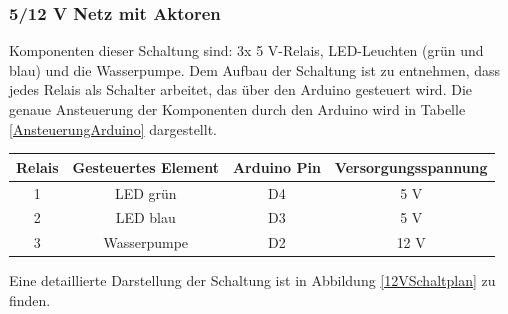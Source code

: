 \subsubsection{5/12 V Netz mit Aktoren}
Komponenten dieser Schaltung sind: 3x 5 V-Relais, LED-Leuchten (grün und blau) und die Wasserpumpe. Dem Aufbau der Schaltung ist zu entnehmen, dass jedes Relais als Schalter arbeitet, das über den Arduino gesteuert wird. Die genaue Ansteuerung der Komponenten durch den Arduino wird in Tabelle \ref{AnsteuerungArduino} dargestellt.
	\begin{center}
	\begin{tabular}{c|c|c|c}
		Relais & Gesteuertes Element & Arduino Pin & Versorgungsspannung\\ \hline
		 1 & LED grün & D4 & 5 V\\
	     2 & LED blau & D3 & 5 V\\
	     3 & Wasserpumpe & D2 & 12 V\\
	\end{tabular}
	\label{AnsteuerungArduino}
\end{center}
Eine detaillierte Darstellung der Schaltung ist in Abbildung \ref{12VSchaltplan} zu finden.
